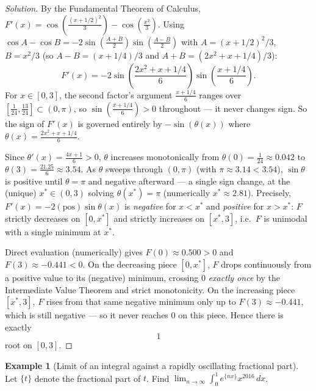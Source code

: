 \documentclass[11pt]{article}
\theoremstyle{definition}
\newtheorem{example}{Example}[section]
\begin{document}
\begin{proof}[Solution]
By the Fundamental Theorem of Calculus, $F'(x)=\cos\!\left(\frac{(x+1/2)^2}{3}\right)-\cos\!\left(\frac{x^2}{3}\right)$. Using $\cos A-\cos B=-2\sin\!\left(\frac{A+B}2\right)\sin\!\left(\frac{A-B}2\right)$ with $A=(x+1/2)^2/3$, $B=x^2/3$ (so $A-B=(x+1/4)/3$ and $A+B=(2x^2+x+1/4)/3$):
\[
F'(x)=-2\sin\!\left(\frac{2x^2+x+1/4}{6}\right)\sin\!\left(\frac{x+1/4}{6}\right).
\]
For $x\in[0,3]$, the second factor's argument $\tfrac{x+1/4}{6}$ ranges over $\left[\tfrac1{24},\tfrac{13}{24}\right]\subset(0,\pi)$, so $\sin\!\left(\tfrac{x+1/4}6\right)>0$ throughout — it never changes sign. So the sign of $F'(x)$ is governed entirely by $-\sin(\theta(x))$ where $\theta(x)=\tfrac{2x^2+x+1/4}{6}$.

Since $\theta'(x)=\tfrac{4x+1}6>0$, $\theta$ increases monotonically from $\theta(0)=\tfrac1{24}\approx0.042$ to $\theta(3)=\tfrac{21.25}6\approx3.54$. As $\theta$ sweeps through $(0,\pi)$ (with $\pi\approx3.14<3.54$), $\sin\theta$ is positive until $\theta=\pi$ and negative afterward — a single sign change, at the (unique) $x^*\in(0,3)$ solving $\theta(x^*)=\pi$ (numerically $x^*\approx2.81$). Precisely, $F'(x)=-2(\text{pos})\sin\theta(x)$ is \emph{negative} for $x<x^*$ and \emph{positive} for $x>x^*$: $F$ strictly decreases on $[0,x^*]$ and strictly increases on $[x^*,3]$, i.e.\ $F$ is unimodal with a single minimum at $x^*$.

Direct evaluation (numerically) gives $F(0)\approx0.500>0$ and $F(3)\approx-0.441<0$. On the decreasing piece $[0,x^*]$, $F$ drops continuously from a positive value to its (negative) minimum, crossing $0$ \emph{exactly once} by the Intermediate Value Theorem and strict monotonicity. On the increasing piece $[x^*,3]$, $F$ rises from that same negative minimum only up to $F(3)\approx-0.441$, which is still negative — so it never reaches $0$ on this piece. Hence there is exactly
\[
\boxed{1}
\]
root on $[0,3]$.
\end{proof}

\begin{example}[Limit of an integral against a rapidly oscillating fractional part]
Let $\{t\}$ denote the fractional part of $t$. Find $\displaystyle\lim_{n\to\infty}\int_0^1 e^{\{nx\}}x^{2016}\,dx$.
\end{example}
\end{document}
